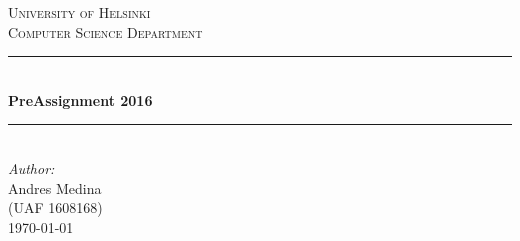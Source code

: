 \documentclass[12p]{report}
\begin{document}

\begin{titlepage}


\newcommand{\HRule}{\rule{\linewidth}{0.5mm}} %

\center %
 

\textsc{\Huge University of Helsinki}\\[2cm] %
\textsc{\LARGE Computer Science Department}\\[0.5cm] %


\HRule \\[0.4cm]
{ \Huge \bfseries PreAssignment 2016}\\[0.4cm] %
\HRule \\[2.5cm]
 


\LARGE \emph{Author:}\\
\LARGE Andres Medina\\[0.05cm] %
\textsc{\Large (UAF 1608168)}\\[3cm] %


{\LARGE \today}\\[3cm] %

 

\vfill %

\end{titlepage}
\end{document}
